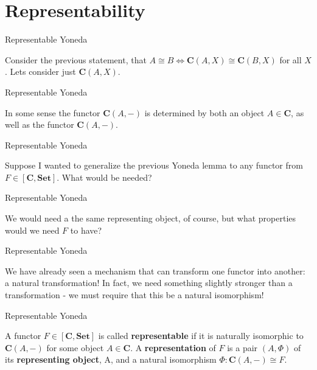 \documentclass[tikz]{beamer}
\theoremstyle{definition}
\newcommand{\cat}[1]{\mathbf{#1}}
\newcommand{\homf}[2]{[\cat{#1}, \cat{#2}]}
\begin{document}
\section{Representability}

\begin{frame}{Representable Yoneda}

Consider the previous statement, that $A \cong B \iff \cat{C}(A, X) \cong \cat{C}(B, X)$ for all $X$. Lets consider just $\cat{C}(A, X)$.

\end{frame}

\begin{frame}{Representable Yoneda}

In some sense the functor $\cat{C}(A, -)$ is determined by both an object $A \in \cat{C}$, as well as the functor $\cat{C}(A,-)$.

\end{frame}

\begin{frame}{Representable Yoneda}

Suppose I wanted to generalize the previous Yoneda lemma to any functor from $F \in \homf{C}{Set}$. What would be needed?

\end{frame}

\begin{frame}{Representable Yoneda}

We would need a the same representing object, of course, but what properties would we need $F$ to have?

\end{frame}

\begin{frame}{Representable Yoneda}

We have already seen a mechanism that can transform one functor into another: a natural transformation! In fact, we need something slightly stronger than a transformation - we must require that this be a natural isomorphism!
\end{frame}

\begin{frame}{Representable Yoneda}

\begin{definition}
A functor $F \in \homf{C}{Set}$ is called \textbf{representable} if it is naturally isomorphic to $\cat{C}(A,-)$ for some object $A \in \cat{C}$. A \textbf{representation} of $F$ is a pair $(A, \Phi)$ of its \textbf{representing object}, A, and a natural isomorphism $\Phi : \cat{C}(A,-) \cong F$.

\end{definition}

\end{frame}
\end{document}
